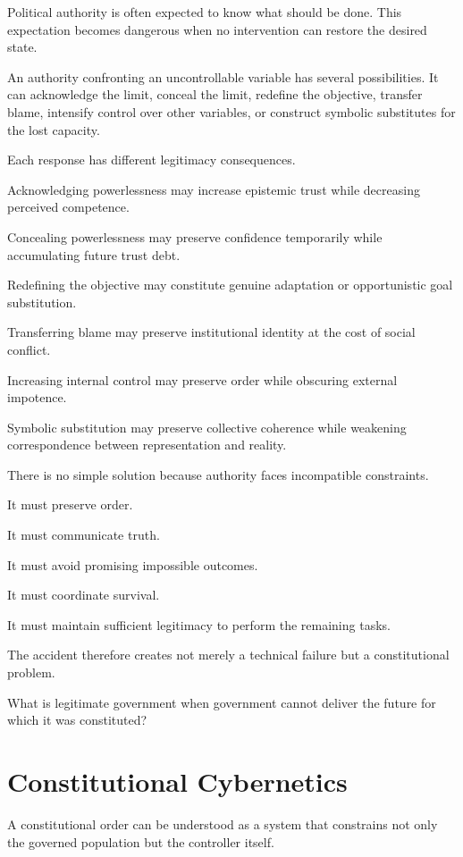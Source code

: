 \documentclass[11pt,oneside]{book}
\theoremstyle{definition}
\theoremstyle{remark}
\begin{document}
Political authority is often expected to know what should be done. This expectation becomes dangerous when no intervention can restore the desired state.

An authority confronting an uncontrollable variable has several possibilities. It can acknowledge the limit, conceal the limit, redefine the objective, transfer blame, intensify control over other variables, or construct symbolic substitutes for the lost capacity.

Each response has different legitimacy consequences.

Acknowledging powerlessness may increase epistemic trust while decreasing perceived competence.

Concealing powerlessness may preserve confidence temporarily while accumulating future trust debt.

Redefining the objective may constitute genuine adaptation or opportunistic goal substitution.

Transferring blame may preserve institutional identity at the cost of social conflict.

Increasing internal control may preserve order while obscuring external impotence.

Symbolic substitution may preserve collective coherence while weakening correspondence between representation and reality.

There is no simple solution because authority faces incompatible constraints.

It must preserve order.

It must communicate truth.

It must avoid promising impossible outcomes.

It must coordinate survival.

It must maintain sufficient legitimacy to perform the remaining tasks.

The accident therefore creates not merely a technical failure but a constitutional problem.

What is legitimate government when government cannot deliver the future for which it was constituted?

\section{Constitutional Cybernetics}

A constitutional order can be understood as a system that constrains not only the governed population but the controller itself.
\end{document}
